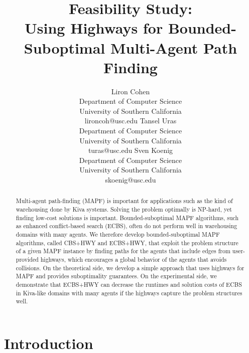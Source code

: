 \documentclass[letterpaper]{article}
\theoremstyle{definition}
\begin{document}
%
\title{Feasibility Study: \\ Using Highways for Bounded-Suboptimal Multi-Agent Path Finding}
\author{Liron Cohen \\ Department of Computer Science \\ University of Southern California \\ lironcoh@usc.edu \And Tansel Uras \\ Department of Computer Science \\ University of Southern California \\ turas@usc.edu \And Sven Koenig \\ Department of Computer Science \\ University of Southern California \\ skoenig@usc.edu}
\maketitle
\begin{abstract}
  Multi-agent path-finding (MAPF) is important for applications such as the
  kind of warehousing done by Kiva systems. Solving the problem optimally is
  NP-hard, yet finding low-cost solutions is important. Bounded-suboptimal
  MAPF algorithms, such as enhanced conflict-based search (ECBS), often do not
  perform well in warehousing domains with many agents. We therefore develop
  bounded-suboptimal MAPF algorithms, called CBS+HWY and ECBS+HWY, that
  exploit the problem structure of a given MAPF instance by finding paths for
  the agents that include edges from user-provided highways, which encourages
  a global behavior of the agents that avoids collisions. On the theoretical
  side, we develop a simple approach that uses highways for MAPF and provides
  suboptimality guarantees. On the experimental side, we demonstrate that
  ECBS+HWY can decrease the runtimes and solution costs of ECBS in Kiva-like
  domains with many agents if the highways capture the problem structures
  well.
\end{abstract}

\section{Introduction}
\end{document}
